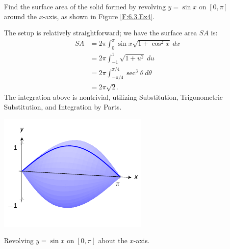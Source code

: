 \begin{example} \label{eg:6.3.4} %
Find the surface area of the solid formed by revolving $y=\sin x$ on $[0,\pi]$ around the $x$-axis, as shown in Figure \ref{F:6.3.Ex4}.

\solution
The setup is relatively straightforward; we have the surface area $SA$ is:
\begin{align*}
SA  &=	2\pi\int_0^\pi \sin x\sqrt{1+\cos^2x}\ dx \\
	&= 2\pi \int_{-1}^1 \sqrt{1+u^2} \ du \\
		&=	2\pi \int_{-\pi/4}^{\pi/4} \sec^3\theta \ d\theta \\
		&= 2\pi\sqrt{2}.		
\end{align*}
The integration above is nontrivial, utilizing Substitution, Trigonometric Substitution, and Integration by Parts.
\end{example}

\begin{marginfigure}[-8cm] %
\includegraphics{figures/figsa1}
\caption{Revolving $y=\sin x$ on $[0,\pi]$ about the $x$-axis.} \label{F:6.3.Ex4}
\end{marginfigure}




